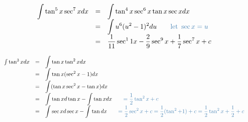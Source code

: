 \begin{eg}
$$\begin{array}{rcl}
\displaystyle \int \tan^5 x \sec^7 x dx & = & \displaystyle \int \tan^4 x \sec^6 x \tan x \sec x dx\\
& = & \displaystyle \int u^6 (u^2 -1)^2 du \quad \quad \tssteelblue{\text{let } \sec x = u}\\
& = & \displaystyle \frac{1}{11} \sec^11 x - \frac{2}{9} \sec^9 x + \frac{1}{7} \sec^7 x +c
\end{array}$$
\end{eg}
\begin{eg}
$$\begin{array}{rcl}
\int \tan^3x dx & = & \displaystyle \int \tan x \tan^2 x dx\\
& = & \displaystyle \int \tan x (\sec^2 x -1) dx\\
& = & \displaystyle \int (\tan x \sec^2 x - \tan x) dx\\
& = & \displaystyle \int \tan x d \tan x - \int \tan x dx \quad \quad \tssteelblue{= \frac{1}{2}\tan^2 x + c}\\
& = & \displaystyle \int \sec x d \sec x - \int \tan dx \quad \quad \tssteelblue{= \frac{1}{2} \sec^2 x + c = \frac{1}{2} (\tan^2 +1) + c = \frac{1}{2} \tan^2 x + \frac{1}{2} + c}
\end{array}$$
\end{eg}

